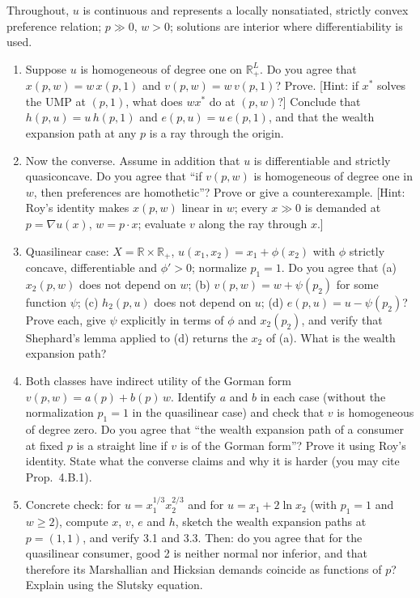 \documentclass[11pt]{article}
\newcommand{\R}{\mathbb{R}}
\begin{document}
Throughout, $u$ is continuous and represents a locally nonsatiated, strictly convex preference relation; $p\gg0$, $w>0$; solutions are interior where differentiability is used.
\begin{enumerate}[label=\textbf{3.\arabic*}]
  \item Suppose $u$ is homogeneous of degree one on $\R^L_+$. Do you agree that $x(p,w)=w\,x(p,1)$ and $v(p,w)=w\,v(p,1)$? Prove. [Hint: if $x^*$ solves the UMP at $(p,1)$, what does $wx^*$ do at $(p,w)$?] Conclude that $h(p,u)=u\,h(p,1)$ and $e(p,u)=u\,e(p,1)$, and that the wealth expansion path at any $p$ is a ray through the origin.
  \item Now the converse. Assume in addition that $u$ is differentiable and strictly quasiconcave. Do you agree that ``if $v(p,w)$ is homogeneous of degree one in $w$, then preferences are homothetic''? Prove or give a counterexample. [Hint: Roy's identity makes $x(p,w)$ linear in $w$; every $x\gg0$ is demanded at $p=\nabla u(x)$, $w=p\cdot x$; evaluate $v$ along the ray through $x$.]
  \item Quasilinear case: $X=\R\times\R_+$, $u(x_1,x_2)=x_1+\phi(x_2)$ with $\phi$ strictly concave, differentiable and $\phi'>0$; normalize $p_1=1$. Do you agree that (a) $x_2(p,w)$ does not depend on $w$; (b) $v(p,w)=w+\psi(p_2)$ for some function $\psi$; (c) $h_2(p,u)$ does not depend on $u$; (d) $e(p,u)=u-\psi(p_2)$? Prove each, give $\psi$ explicitly in terms of $\phi$ and $x_2(p_2)$, and verify that Shephard's lemma applied to (d) returns the $x_2$ of (a). What is the wealth expansion path?
  \item Both classes have indirect utility of the Gorman form $v(p,w)=a(p)+b(p)\,w$. Identify $a$ and $b$ in each case (without the normalization $p_1=1$ in the quasilinear case) and check that $v$ is homogeneous of degree zero. Do you agree that ``the wealth expansion path of a consumer at fixed $p$ is a straight line if $v$ is of the Gorman form''? Prove it using Roy's identity. State what the converse claims and why it is harder (you may cite Prop.~4.B.1).
  \item Concrete check: for $u=x_1^{1/3}x_2^{2/3}$ and for $u=x_1+2\ln x_2$ (with $p_1=1$ and $w\ge2$), compute $x$, $v$, $e$ and $h$, sketch the wealth expansion paths at $p=(1,1)$, and verify 3.1 and 3.3. Then: do you agree that for the quasilinear consumer, good 2 is neither normal nor inferior, and that therefore its Marshallian and Hicksian demands coincide as functions of $p$? Explain using the Slutsky equation.
\end{enumerate}
\end{document}
